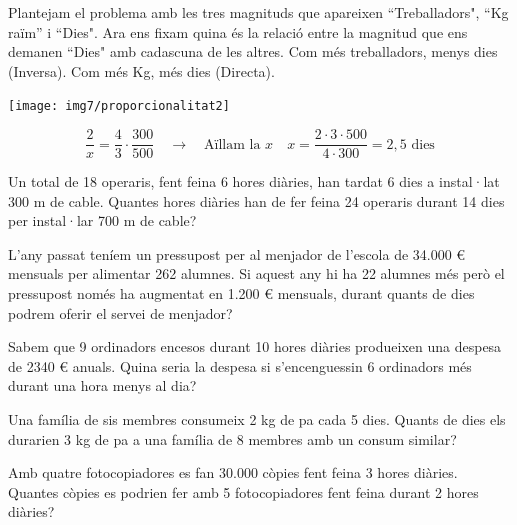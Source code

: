 \begin{example}
	
	\begin{minipage}{0.6\textwidth}
		Plantejam el problema amb les tres magnituds que apareixen ``Treballadors", ``Kg raïm'' i ``Dies". 
		Ara ens fixam quina és la relació entre la magnitud que ens demanen ``Dies" amb cadascuna de les altres.
		Com més treballadors, menys dies (Inversa). Com més Kg, més dies (Directa).
		
	\end{minipage}
	\begin{minipage}{0.4\textwidth}
		\centering
		\texttt{[image: img7/proporcionalitat2]}
	\end{minipage}
	
	\[ \frac{2}{x} = \boxed{ \frac{4}{3} } \cdot \frac{300}{500} \quad \rightarrow \quad \text{Aïllam la }x \quad x=\frac{2\cdot 3 \cdot 500}{4\cdot 300}= 2,5 \text{ dies}  \]
	
\end{example}
 
 
 \begin{mylist}
 	

\exer
  Un total de 18 operaris, fent feina 6 hores diàries, han tardat 6 dies
  a instal·lat 300 m de cable. Quantes hores diàries han de fer feina 24
  operaris durant 14 dies per instal·lar 700 m de cable?


\exer
  L'any passat teníem un pressupost per al menjador de l'escola de
  34.000 \euro{} mensuals per alimentar 262 alumnes. Si aquest any hi ha
  22 alumnes més però el pressupost només ha augmentat en 1.200 \euro{}
  mensuals, durant quants de dies podrem oferir el servei de menjador?

\exer
  Sabem que 9 ordinadors encesos durant 10 hores diàries produeixen una
  despesa de 2340 \euro{} anuals. Quina seria la despesa si
  s'encenguessin 6 ordinadors més durant una hora menys al dia?


\exer
  Una família de sis membres consumeix 2 kg de pa cada 5 dies. Quants de
  dies els durarien 3 kg de pa a una família de 8 membres amb un consum
  similar?


\exer
  Amb quatre fotocopiadores es fan 30.000 còpies fent feina 3 hores
  diàries. Quantes còpies es podrien fer amb 5 fotocopiadores fent feina
  durant 2 hores diàries?


\end{mylist}


